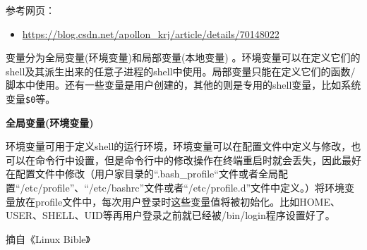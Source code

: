 \documentclass[doctor,openright,twoside]{sjtuthesis}
\providecommand{\tightlist}{%
    \setlength{\itemsep}{0pt}\setlength{\parskip}{0pt}}
\newcommand{\passthrough}[1]{#1}
\theoremstyle{plain}
\theoremstyle{definition}
\theoremstyle{remark}
\theoremstyle{ocrenumbox}
\theoremstyle{plain}
\begin{document}
参考网页：

\begin{itemize}
\tightlist
\item
  \url{https://blog.csdn.net/apollon_krj/article/details/70148022}
\end{itemize}

变量分为全局变量(环境变量)和局部变量(本地变量)
。环境变量可以在定义它们的shell及其派生出来的任意子进程的shell中使用。局部变量只能在定义它们的函数/脚本中使用。还有一些变量是用户创建的，其他的则是专用的shell变量，比如系统变量\passthrough{\lstinline!$0!}等。

\textbf{全局变量(环境变量)}

环境变量可用于定义shell的运行环境，环境变量可以在配置文件中定义与修改，也可以在命令行中设置，但是命令行中的修改操作在终端重启时就会丢失，因此最好在配置文件中修改（用户家目录的``.bash\_profile``文件或者全局配置``/etc/profile''、``/etc/bashrc''文件或者``/etc/profile.d''文件中定义。）将环境变量放在profile文件中，每次用户登录时这些变量值将被初始化。比如HOME、USER、SHELL、UID等再用户登录之前就已经被/bin/login程序设置好了。

摘自《Linux Bible》
\end{document}
